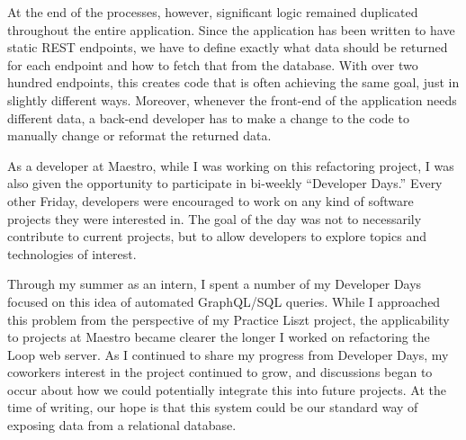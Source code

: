 At the end of the processes, however, significant logic remained duplicated throughout the entire application.  Since the application has been written to have static REST endpoints, we have to define exactly what data should be returned for each endpoint and how to fetch that from the database. With over two hundred endpoints, this creates code that is often achieving the same goal, just in slightly different ways.  Moreover, whenever the front-end of the application needs different data, a back-end developer has to make a change to the code to manually change or reformat the returned data.

As a developer at Maestro, while I was working on this refactoring project, I was also given the opportunity to participate in bi-weekly ``Developer Days.''  Every other Friday, developers were encouraged to work on any kind of software projects they were interested in.  The goal of the day was not to necessarily contribute to current projects, but to allow developers to explore topics and technologies of interest.

Through my summer as an intern, I spent a number of my Developer Days focused on this idea of automated GraphQL/SQL queries. While I approached this problem from the perspective of my Practice Liszt project, the applicability to projects at Maestro became clearer the longer I worked on refactoring the Loop web server.  As I continued to share my progress from Developer Days, my coworkers interest in the project continued to grow, and discussions began to occur about how we could potentially integrate this into future projects.  At the time of writing, our hope is that this system could be our standard way of exposing data from a relational database.